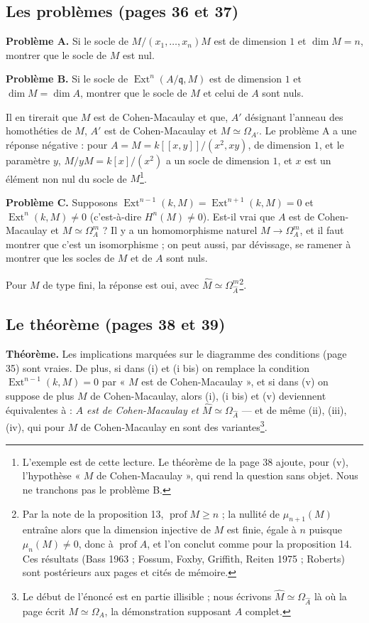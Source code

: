 \documentclass[11pt,a4paper]{article}
\begin{document}
\subsection*{Les problèmes (pages 36 et 37)}

\textbf{Problème A.} Si le socle de $M/(x_1, \ldots, x_n)M$ est de dimension
$1$ et $\dim M = n$, montrer que le socle de $M$ est nul.

\textbf{Problème B.} Si le socle de $\operatorname{Ext}^n(A/\mathfrak{q}, M)$
est de dimension $1$ et $\dim M = \dim A$, montrer que le socle de $M$ et celui
de $A$ sont nuls.

Il en tirerait que $M$ est de Cohen-Macaulay et que, $A'$ désignant l'anneau
des homothéties de $M$, $A'$ est de Cohen-Macaulay et $M \simeq \Omega_{A'}$.
Le problème A a une réponse négative : pour $A = M = k[[x,y]]/(x^2, xy)$, de
dimension $1$, et le paramètre $y$, $M/yM = k[x]/(x^2)$ a un socle de dimension
$1$, et $x$ est un élément non nul du socle de $M$\footnote{L'exemple est de
cette lecture. Le théorème de la page 38 ajoute, pour (v), l'hypothèse « $M$
de Cohen-Macaulay », qui rend la question sans objet. Nous ne tranchons pas le
problème B.}.

\textbf{Problème C.} Supposons $\operatorname{Ext}^{n-1}(k, M) =
\operatorname{Ext}^{n+1}(k, M) = 0$ et $\operatorname{Ext}^n(k, M) \neq 0$
(c'est-à-dire $H^n(M) \neq 0$). Est-il vrai que $A$ est de Cohen-Macaulay et
$M \simeq \Omega_A^m$ ? Il y a un homomorphisme naturel $M \to \Omega_A^m$, et
il faut montrer que c'est un isomorphisme ; on peut aussi, par dévissage, se
ramener à montrer que les socles de $M$ et de $A$ sont nuls.

Pour $M$ de type fini, la réponse est oui, avec $\widehat{M} \simeq
\Omega_{\widehat{A}}^m$\footnote{Par la note de la proposition 13,
$\operatorname{prof} M \geqslant n$ ; la nullité de $\mu_{n+1}(M)$ entraîne
alors que la dimension injective de $M$ est finie, égale à $n$ puisque
$\mu_n(M) \neq 0$, donc à $\operatorname{prof} A$, et l'on conclut comme pour
la proposition 14. Ces résultats (Bass 1963 ; Fossum, Foxby, Griffith, Reiten
1975 ; Roberts) sont postérieurs aux pages et cités de mémoire.}.

\subsection*{Le théorème (pages 38 et 39)}

\textbf{Théorème.} Les implications marquées sur le diagramme des conditions
(page 35) sont vraies. De plus, si dans (i) et (i bis) on remplace la condition
$\operatorname{Ext}^{n-1}(k, M) = 0$ par « $M$ est de Cohen-Macaulay », et si
dans (v) on suppose de plus $M$ de Cohen-Macaulay, alors (i), (i bis) et (v)
deviennent équivalentes à : \emph{$A$ est de Cohen-Macaulay et $\widehat{M}
\simeq \Omega_{\widehat{A}}$} --- et de même (ii), (iii), (iv), qui pour $M$
de Cohen-Macaulay en sont des variantes\footnote{Le début de l'énoncé est en
partie illisible ; nous écrivons $\widehat{M} \simeq \Omega_{\widehat{A}}$ là
où la page écrit $M \simeq \Omega_A$, la démonstration supposant $A$ complet.}.
\end{document}
